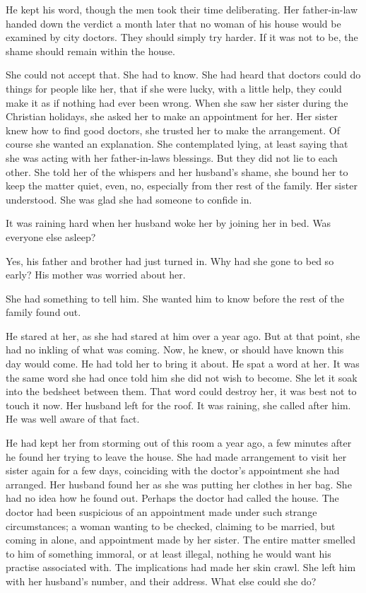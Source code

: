 \documentclass{article}
\begin{document}
He kept his word, though the men took their time deliberating. Her father-in-law handed down the verdict a month later that no woman of his house would be examined by city doctors. They should simply try harder. If it was not to be, the shame should remain within the house. 

She could not accept that. She had to know. She had heard that doctors could do things for people like her, that if she were lucky, with a little help, they  could make it as if nothing had ever been wrong. When she saw her sister during the Christian holidays, she asked her to make an appointment for her. Her sister knew how to find good doctors, she trusted her to make the arrangement. Of course she wanted an explanation. She contemplated lying, at least saying that she was acting with her father-in-laws blessings. But they did not lie to each other. She told her of the whispers and her husband's shame, she bound her to keep the matter quiet, even, no, especially from ther rest of the family. Her sister understood. She was glad she had someone to confide in.

It was raining hard when her husband woke her by joining her in bed. Was everyone else asleep? 

Yes, his father and brother had just turned in. Why had she gone to bed so early? His mother was worried about her.

She had something to tell him. She wanted him to know before the rest of the family found out.

He stared at her, as she had stared at him over a year ago. But at that point, she had no inkling of what was coming. Now, he knew, or should have known this day would come. He had told her to bring it about. He spat a word at her. It was the same word she had once told him she did not wish to become. She let it soak into the bedsheet between them. That word could destroy her, it was best not to touch it now. Her husband left for the roof. It was raining, she called after him. He was well aware of that fact. 

He had kept her from storming out of this room a year ago, a few minutes after he found her trying to leave the house. She had made arrangement to visit her sister again for a few days, coinciding with the doctor's appointment she had arranged. Her husband found her as she was putting her clothes in her bag. She had no idea how he found out. Perhaps the doctor had called the house. The doctor had been suspicious of an appointment made under such strange circumstances; a woman wanting to be checked, claiming to be married, but coming in alone, and appointment made by her sister. The entire matter smelled to him of something immoral, or at least illegal, nothing he would want his practise associated with. The implications had made her skin crawl. She left him with her husband's number, and their address. What else could she do?
\end{document}
